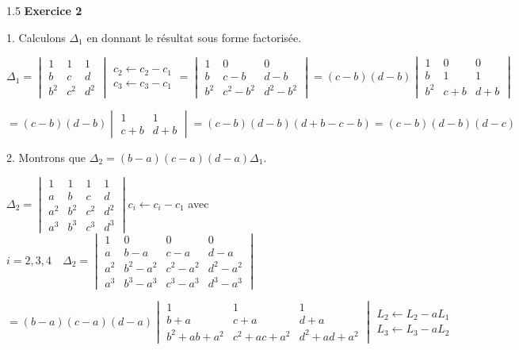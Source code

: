 \documentclass[12pt]{article}
\begin{document}
\begin{spacing}{1.5}
\medskip\textbf{Exercice 2}

1. Calculons $\Delta_1$ en donnant le résultat sous forme factorisée.

$\Delta_1= \begin{vmatrix}
 1 & 1 & 1\\
 b & c & d\\
 b^2 & c^2 & d^2
 \end{vmatrix}\begin{array}{c}
 c_2\longleftarrow c_2-c_1\\
 c_3\longleftarrow c_3-c_1
 \end{array}=\begin{vmatrix}
 1 & 0 & 0\\
 b & c-b & d-b\\
 b^2 & c^2-b^2 & d^2-b^2
 \end{vmatrix}=(c-b)(d-b)\begin{vmatrix}
 1 & 0 & 0\\
 b & 1 & 1\\
 b^2 & c+b & d+b
 \end{vmatrix}$
 
 $=(c-b)(d-b)\begin{vmatrix}
 1 & 1\\
 c+b & d+b
 \end{vmatrix}=(c-b)(d-b)(d+b-c-b)=(c-b)(d-b)(d-c)$
 
2. Montrons que $\Delta_2 =(b-a)(c-a)(d-a)\Delta_1$. 
 
 $\Delta_2=\begin{vmatrix}
 1 & 1 & 1 & 1 \\
 a & b & c & d \\
 a^2 & b^2 & c^2 & d^2 \\
 a^3 & b^3 & c^3 & d^3
\end{vmatrix} c_i\longleftarrow c_i-c_1$ avec $i=2,3,4 \quad\Delta_2=\begin{vmatrix}
 1 & 0 & 0 & 0 \\
 a & b-a & c-a & d-a \\
 a^2 & b^2-a^2 & c^2-a^2 & d^2-a^2 \\
 a^3 & b^3-a^3 & c^3-a^3 & d^3-a^3
\end{vmatrix}$

$=(b-a)(c-a)(d-a)\begin{vmatrix}
1 & 1 & 1 \\ 
b+a & c+a & d+a \\ 
b^2+ab+a^2 & c^2+ac+a^2 & d^2+ad+a^2
\end{vmatrix}\begin{array}{c}
L_2\longleftarrow L_2-aL_1\\
L_3\longleftarrow L_3-aL_2
\end{array}$


\end{spacing}
\end{document}
